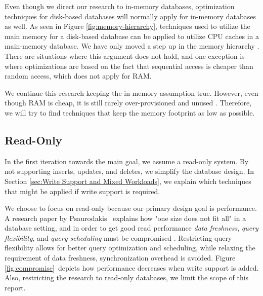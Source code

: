 Even though we direct our research to in-memory databases, optimization techniques for disk-based databases will normally apply for in-memory databases as well. As seen in Figure \ref{fig:memory-hierarchy}, techniques used to utilize the main memory for a disk-based database can be applied to utilize CPU caches in a main-memory database. We have only moved a step up in the memory hierarchy \cite{Boncz2002-yj}. There are situations where this argument does not hold, and one exception is where optimizations are based on the fact that sequential access is cheaper than random access, which does not apply for RAM.

We continue this research keeping the in-memory assumption true. However, even though RAM is cheap, it is still rarely over-provisioned and unused \cite{Barber2014-ey}. Therefore, we will try to find techniques that keep the memory footprint as low as possible.


\subsection{Read-Only}
\label{sub:Read-Only}
In the first iteration towards the main goal, we assume a read-only system. By not supporting inserts, updates, and deletes, we simplify the database design. In Section \ref{sec:Write Support and Mixed Workloads}, we explain which techniques that might be applied if write support is required.

We choose to focus on read-only because our primary design goal is performance. A research paper by Psaurodakis \ea~explains how "one size does not fit all" in a database setting, and in order to get good read performance \textit{data freshness}, \textit{query flexibility}, and \textit{query scheduling} must be compromised \cite{Psaroudakis2014-ma}. Restricting query flexibility allows for better query optimization and scheduling, while relaxing the requirement of data freshness, synchronization overhead is avoided. Figure \ref{fig:compromise}~depicts how performance decreases when write support is added. Also, restricting the research to read-only databases, we limit the scope of this report. 


